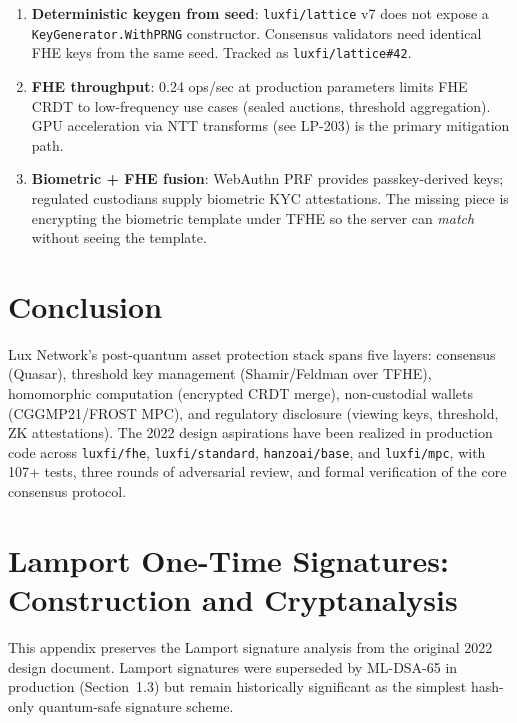 \documentclass[11pt,a4paper]{article}
\begin{document}
\begin{enumerate}[nosep]
  \item \textbf{Deterministic keygen from seed}: \texttt{luxfi/lattice}
        v7 does not expose a \texttt{KeyGenerator.WithPRNG} constructor.
        Consensus validators need identical FHE keys from the same seed.
        Tracked as \texttt{luxfi/lattice\#42}.
  \item \textbf{FHE throughput}: 0.24 ops/sec at production parameters
        limits FHE CRDT to low-frequency use cases (sealed auctions,
        threshold aggregation). GPU acceleration via NTT transforms
        (see LP-203) is the primary mitigation path.
  \item \textbf{Biometric + FHE fusion}: WebAuthn PRF provides
        passkey-derived keys; regulated custodians supply biometric
        KYC attestations. The missing piece is encrypting the
        biometric template under TFHE so the server can \emph{match}
        without seeing the template.
\end{enumerate}

\section{Conclusion}

Lux Network's post-quantum asset protection stack spans five layers:
consensus (Quasar), threshold key management (Shamir/Feldman over
TFHE), homomorphic computation (encrypted CRDT merge), non-custodial
wallets (CGGMP21/FROST MPC), and regulatory disclosure (viewing keys,
threshold, ZK attestations). The 2022 design aspirations have been
realized in production code across \texttt{luxfi/fhe},
\texttt{luxfi/standard}, \texttt{hanzoai/base}, and \texttt{luxfi/mpc},
with 107+ tests, three rounds of adversarial review, and formal
verification of the core consensus protocol.

\appendix
\section{Lamport One-Time Signatures: Construction and Cryptanalysis}
\label{app:lamport}

This appendix preserves the Lamport signature analysis from the
original 2022 design document. Lamport signatures were superseded by
ML-DSA-65 in production (Section~1.3) but remain historically
significant as the simplest hash-only quantum-safe signature scheme.
\end{document}
